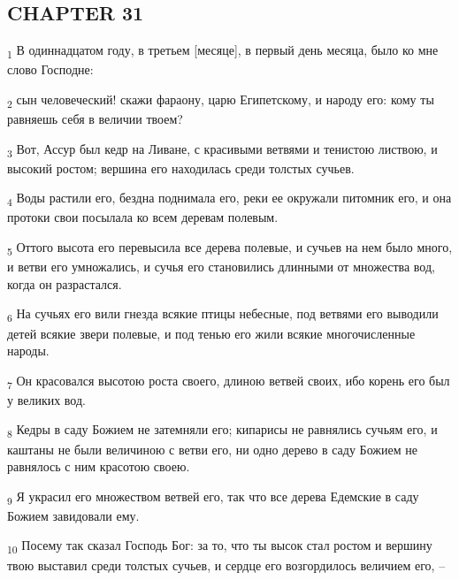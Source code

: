 \subsection{CHAPTER 31}
\begin{tcolorbox}
\textsubscript{1} В одиннадцатом году, в третьем [месяце], в первый день месяца, было ко мне слово Господне:
\end{tcolorbox}
\begin{tcolorbox}
\textsubscript{2} сын человеческий! скажи фараону, царю Египетскому, и народу его: кому ты равняешь себя в величии твоем?
\end{tcolorbox}
\begin{tcolorbox}
\textsubscript{3} Вот, Ассур был кедр на Ливане, с красивыми ветвями и тенистою листвою, и высокий ростом; вершина его находилась среди толстых сучьев.
\end{tcolorbox}
\begin{tcolorbox}
\textsubscript{4} Воды растили его, бездна поднимала его, реки ее окружали питомник его, и она протоки свои посылала ко всем деревам полевым.
\end{tcolorbox}
\begin{tcolorbox}
\textsubscript{5} Оттого высота его перевысила все дерева полевые, и сучьев на нем было много, и ветви его умножались, и сучья его становились длинными от множества вод, когда он разрастался.
\end{tcolorbox}
\begin{tcolorbox}
\textsubscript{6} На сучьях его вили гнезда всякие птицы небесные, под ветвями его выводили детей всякие звери полевые, и под тенью его жили всякие многочисленные народы.
\end{tcolorbox}
\begin{tcolorbox}
\textsubscript{7} Он красовался высотою роста своего, длиною ветвей своих, ибо корень его был у великих вод.
\end{tcolorbox}
\begin{tcolorbox}
\textsubscript{8} Кедры в саду Божием не затемняли его; кипарисы не равнялись сучьям его, и каштаны не были величиною с ветви его, ни одно дерево в саду Божием не равнялось с ним красотою своею.
\end{tcolorbox}
\begin{tcolorbox}
\textsubscript{9} Я украсил его множеством ветвей его, так что все дерева Едемские в саду Божием завидовали ему.
\end{tcolorbox}
\begin{tcolorbox}
\textsubscript{10} Посему так сказал Господь Бог: за то, что ты высок стал ростом и вершину твою выставил среди толстых сучьев, и сердце его возгордилось величием его, --
\end{tcolorbox}
